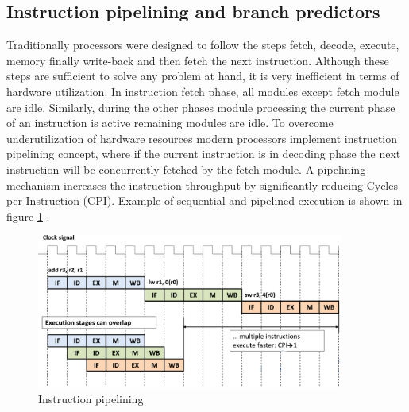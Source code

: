 \subsection{Instruction pipelining and branch predictors}
Traditionally processors were designed to follow the steps fetch, decode, execute, memory finally write-back and then fetch the next instruction. Although these steps are sufficient to solve any problem at hand, it is very inefficient in terms of hardware utilization. In instruction fetch phase, all modules except fetch module are idle. Similarly, during the other phases module processing the current phase of an instruction is active remaining modules are idle. To overcome underutilization of hardware resources modern processors implement instruction pipelining concept, where if the current instruction is in decoding phase the next instruction will be concurrently fetched by the fetch module. A pipelining mechanism increases the instruction throughput by significantly reducing Cycles per Instruction (CPI). Example of sequential and pipelined execution is shown in figure \ref{fig:pipeline} \cite{SoCT}.

\begin{figure}[h]
	\centering
	\includegraphics[width=0.9\textwidth]{./figures/pipeline_seq2_edited.pdf}
	\caption{Instruction pipelining}
	\label{fig:pipeline}
\end{figure}

